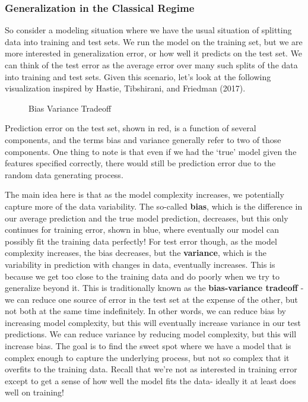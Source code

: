 \documentclass[
  letterpaper,
]{krantz}
\begin{document}
\subsubsection{Generalization in the Classical
Regime}\label{generalization-in-the-classical-regime}

So consider a modeling situation where we have the usual situation of
splitting data into training and test sets. We run the model on the
training set, but we are more interested in generalization error, or how
well it predicts on the test set. We can think of the test error as the
average error over many such splits of the data into training and test
sets. Given this scenario, let's look at the following visualization
inspired by Hastie, Tibshirani, and Friedman (2017).

\begin{figure}[H]


\caption{\label{fig-bias-variance}Bias Variance Tradeoff}

\end{figure}%

Prediction error on the test set, shown in red, is a function of several
components, and the terms bias and variance generally refer to two of
those components. One thing to note is that even if we had the `true'
model given the features specified correctly, there would still be
prediction error due to the random data generating process.

The main idea here is that as the model complexity increases, we
potentially capture more of the data variability. The so-called
\textbf{bias}, which is the difference in our average prediction and the
true model prediction, decreases, but this only continues for training
error, shown in blue, where eventually our model can possibly fit the
training data perfectly! For test error though, as the model complexity
increases, the bias decreases, but the \textbf{variance}, which is the
variability in prediction with changes in data, eventually increases.
This is because we get too close to the training data and do poorly when
we try to generalize beyond it. This is traditionally known as the
\textbf{bias-variance tradeoff} - we can reduce one source of error in
the test set at the expense of the other, but not both at the same time
indefinitely. In other words, we can reduce bias by increasing model
complexity, but this will eventually increase variance in our test
predictions. We can reduce variance by reducing model complexity, but
this will increase bias. The goal is to find the sweet spot where we
have a model that is complex enough to capture the underlying process,
but not so complex that it overfits to the training data. Recall that
we're not as interested in training error except to get a sense of how
well the model fits the data- ideally it at least does well on training!
\end{document}

